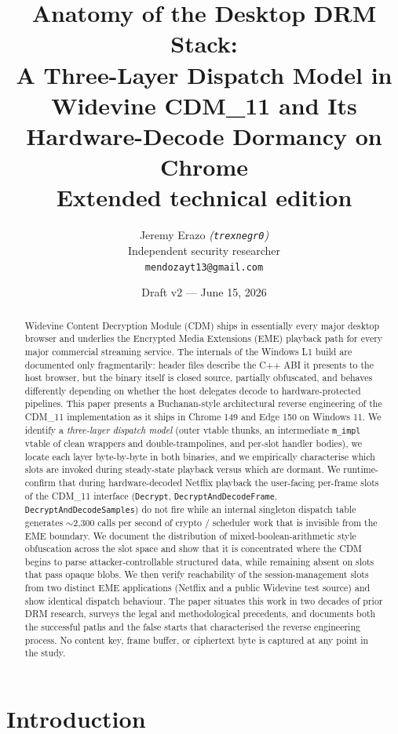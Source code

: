 \documentclass[11pt,letterpaper]{article}
\title{\textbf{Anatomy of the Desktop DRM Stack:\\
A Three-Layer Dispatch Model in Widevine CDM\_11
and Its Hardware-Decode Dormancy on Chrome \\
\large{Extended technical edition}}}
\author{
  Jeremy Erazo \textit{(\texttt{trexnegr0})} \\
  Independent security researcher \\
  \texttt{mendozayt13@gmail.com}
}
\date{Draft v2 --- June 15, 2026}
\let\oldsection\section
\renewcommand{\section}{\clearpage\oldsection}
\begin{document}
\maketitle

\begin{abstract}
\noindent
Widevine Content Decryption Module (CDM) ships in essentially every
major desktop browser and underlies the Encrypted Media Extensions
(EME) playback path for every major commercial streaming service.
The internals of the Windows L1 build are documented only
fragmentarily: header files describe the C++ ABI it presents to the
host browser, but the binary itself is closed source, partially
obfuscated, and behaves differently depending on whether the host
delegates decode to hardware-protected pipelines.
This paper presents a Buchanan-style architectural reverse engineering
of the CDM\_11 implementation as it ships in Chrome 149 and Edge 150
on Windows 11. We identify a \emph{three-layer dispatch model} (outer
vtable thunks, an intermediate \texttt{m\_impl} vtable of clean
wrappers and double-trampolines, and per-slot handler bodies), we
locate each layer byte-by-byte in both binaries, and we empirically
characterise which slots are invoked during steady-state playback
versus which are dormant. We runtime-confirm that during
hardware-decoded Netflix playback the user-facing per-frame slots of
the CDM\_11 interface (\texttt{Decrypt},
\texttt{DecryptAndDecodeFrame}, \texttt{DecryptAndDecodeSamples}) do
not fire while an internal singleton dispatch table generates
$\sim$2{,}300 calls per second of crypto / scheduler work that is
invisible from the EME boundary. We document the distribution of
mixed-boolean-arithmetic style obfuscation across the slot space and
show that it is concentrated where the CDM begins to parse
attacker-controllable structured data, while remaining absent on slots
that pass opaque blobs. We then verify reachability of the
session-management slots from two distinct EME applications (Netflix
and a public Widevine test source) and show identical dispatch
behaviour. The paper situates this work in two decades of prior DRM
research, surveys the legal and methodological precedents, and
documents both the successful paths and the false starts that
characterised the reverse engineering process. No content key, frame
buffer, or ciphertext byte is captured at any point in the study.
\end{abstract}

\section{Introduction}
\label{sec:intro}
\end{document}
